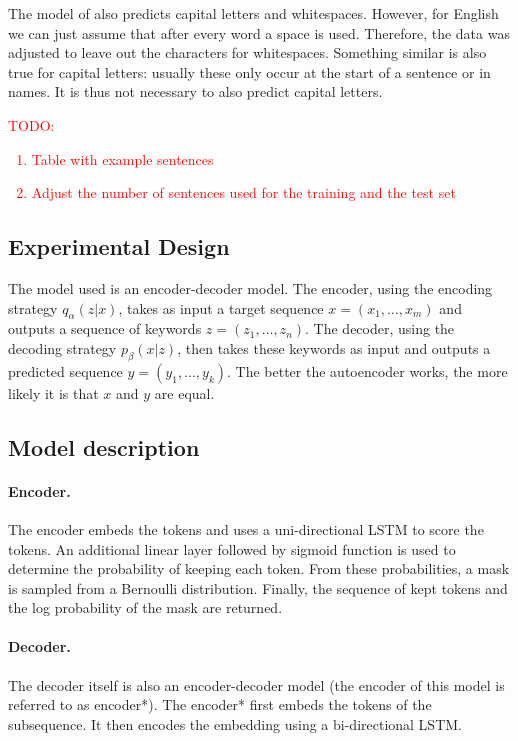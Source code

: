 \documentclass[a4paper, 12pt]{report}
\begin{document}
The model of  also predicts capital letters and whitespaces. 
However, for English we can just assume that after every word a space is used. 
Therefore, the data was adjusted to leave out the characters for whitespaces. 
Something similar is also true for capital letters: usually these only occur at the start of a sentence or in names. 
It is thus not necessary to also predict capital letters. 

\noindent\textcolor{red}{TODO: \begin{enumerate}
    \item Table with example sentences
    \item Adjust the number of sentences used for the training and the test set
\end{enumerate}}

\subsection{Experimental Design}
The model used is an encoder-decoder model.
The encoder, using the encoding strategy $q_{\alpha}(z|x)$, takes as input a target sequence $x = (x_1, \dots, x_m)$ and outputs a sequence of keywords $z = (z_1, \dots, z_n)$.
The decoder, using the decoding strategy $p_{\beta}(x|z)$, then takes these keywords as input and outputs a predicted sequence $y = (y_1, \dots, y_k)$. 
The better the autoencoder works, the more likely it is that $x$ and $y$ are equal. 

\subsection{Model description}
\label{sec:model}
\paragraph{Encoder.} 
The encoder embeds the tokens and uses a uni-directional LSTM to score the tokens.
An additional linear layer followed by sigmoid function is used to determine the probability of keeping each token. 
From these probabilities, a mask is sampled from a Bernoulli distribution. 
Finally, the sequence of kept tokens and the log probability of the mask are returned.

\paragraph{Decoder.} 
The decoder itself is also an encoder-decoder model (the encoder of this model is referred to as encoder*).
The encoder* first embeds the tokens of the subsequence.
It then encodes the embedding using a bi-directional LSTM. 
\end{document}
